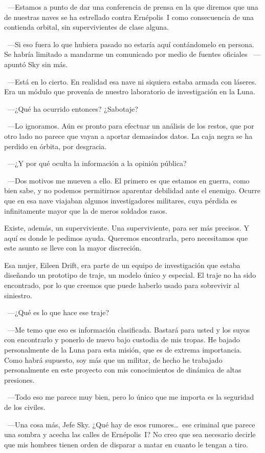~---Estamos a punto de dar una conferencia de prensa en la que diremos que una de nuestras naves se ha estrellado contra Ernépolis~I como consecuencia de una contienda orbital, sin supervivientes de clase alguna.

~---Si eso fuera lo que hubiera pasado no estaría aquí contándomelo en persona. Se habría limitado a mandarme un comunicado por medio de fuentes oficiales ~---apuntó Sky sin más.

~---Está en lo cierto. En realidad esa nave ni siquiera estaba armada con láseres. Era un módulo que provenía de nuestro laboratorio de investigación en la Luna.

~---¿Qué ha ocurrido entonces? ¿Sabotaje?

~---Lo ignoramos. Aún es pronto para efectuar un análisis de los restos, que por otro lado no parece que vayan a aportar demasiados datos. La caja negra se ha perdido en órbita, por desgracia.

~---¿Y por qué oculta la información a la opinión pública?

~---Dos motivos me mueven a ello. El primero es que estamos en guerra, como bien sabe, y no podemos permitirnos aparentar debilidad ante el enemigo. Ocurre que en esa nave viajaban algunos investigadores militares, cuya pérdida es infinitamente mayor que la de meros soldados rasos.

\rquoti Existe, además, un superviviente. Una superviviente, para ser más precisos. Y aquí es donde le pedimos ayuda. Queremos encontrarla, pero necesitamos que este asunto se lleve con la mayor discreción.

\rquoti Esa mujer, Eileen Drift, era parte de un equipo de investigación que estaba diseñando un prototipo de traje, un modelo único y especial. El traje no ha sido encontrado, por lo que creemos que puede haberlo usado para sobrevivir al siniestro.

~---¿Qué es lo que hace ese traje?

~---Me temo que eso es información clasificada. Bastará para usted y los suyos con encontrarlo y ponerlo de nuevo bajo custodia de mis tropas. He bajado personalmente de la Luna para esta misión, que es de extrema importancia. Como habrá supuesto, soy más que un militar, de hecho he trabajado personalmente en este proyecto con mis conocimientos de dinámica de altas presiones.

~---Todo eso me parece muy bien, pero lo único que me importa es la seguridad de los civiles.

~---Una cosa más, Jefe Sky. ¿Qué hay de esos rumores\dots\ ese criminal que parece una sombra y acecha las calles de Ernépolis~I? No creo que sea necesario decirle que mis hombres tienen orden de disparar a matar en cuanto le tengan a tiro.

